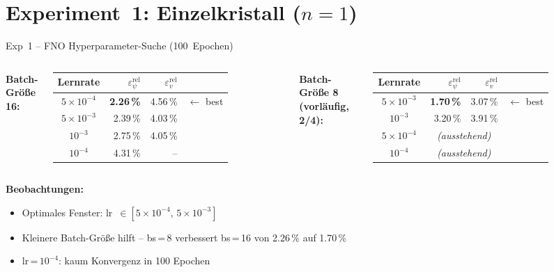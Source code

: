 \documentclass[aspectratio=169]{beamer}
\begin{document}
\section{Experiment~1: Einzelkristall ($n=1$)}
\begin{frame}{Exp~1 -- FNO Hyperparameter-Suche (100~Epochen)}
  \begin{columns}[T]
      \textbf{Batch-Größe 16:}
      \vspace{4pt}
      \renewcommand{\arraystretch}{1.35}
      \begin{tabular}{crrl}
        \toprule
        Lernrate & $\varepsilon_\psi^{\text{rel}}$ & $\varepsilon_v^{\text{rel}}$ & \\
        \midrule
        $5\!\times\!10^{-4}$ & \textcolor{bestgreen}{\textbf{2.26\,\%}} & 4.56\,\% & $\leftarrow$ best \\
        $5\!\times\!10^{-3}$ & 2.39\,\% & 4.03\,\% & \\
        $10^{-3}$            & 2.75\,\% & 4.05\,\% & \\
        $10^{-4}$            & \textcolor{warnred}{4.31\,\%} & -- & \\
        \bottomrule
      \end{tabular}

      \textbf{Batch-Größe 8 (vorläufig, 2/4):}
      \vspace{4pt}
      \renewcommand{\arraystretch}{1.35}
      \begin{tabular}{crrl}
        \toprule
        Lernrate & $\varepsilon_\psi^{\text{rel}}$ & $\varepsilon_v^{\text{rel}}$ & \\
        \midrule
        $5\!\times\!10^{-3}$ & \textcolor{bestgreen}{\textbf{1.70\,\%}} & 3.07\,\% & $\leftarrow$ best \\
        $10^{-3}$            & 3.20\,\% & 3.91\,\% & \\
        $5\!\times\!10^{-4}$ & \multicolumn{2}{c}{\textit{(ausstehend)}} & \\
        $10^{-4}$            & \multicolumn{2}{c}{\textit{(ausstehend)}} & \\
        \bottomrule
      \end{tabular}
  \end{columns}

  \vspace{10pt}
  \textbf{Beobachtungen:}
  \begin{itemize}
    \item Optimales Fenster: lr~$\in [5\!\times\!10^{-4},\,5\!\times\!10^{-3}]$
    \item Kleinere Batch-Größe hilft -- bs\,=\,8 verbessert bs\,=\,16 von 2.26\,\% auf 1.70\,\%
    \item lr\,=\,$10^{-4}$: kaum Konvergenz in 100 Epochen
  \end{itemize}
\end{frame}
\end{document}
